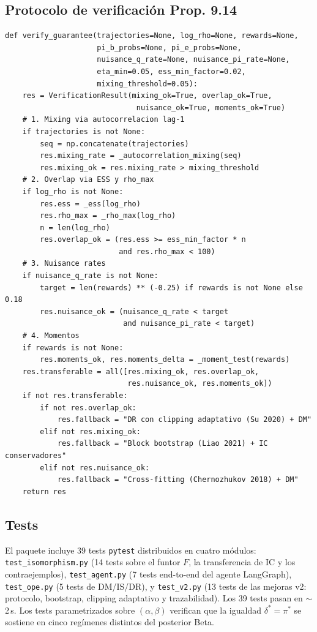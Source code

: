 \documentclass[11pt,a4paper]{article}
\theoremstyle{mitheorem}
\theoremstyle{mitdef}
\newcommand{\decrule}{\delta}
\newcommand{\policy}{\pi}
\begin{document}
\subsection{Protocolo de verificación Prop. 9.14}

\begin{lstlisting}[caption={Implementación del protocolo Prop.~9.14.}]
def verify_guarantee(trajectories=None, log_rho=None, rewards=None,
                     pi_b_probs=None, pi_e_probs=None,
                     nuisance_q_rate=None, nuisance_pi_rate=None,
                     eta_min=0.05, ess_min_factor=0.02,
                     mixing_threshold=0.05):
    res = VerificationResult(mixing_ok=True, overlap_ok=True,
                              nuisance_ok=True, moments_ok=True)
    # 1. Mixing via autocorrelacion lag-1
    if trajectories is not None:
        seq = np.concatenate(trajectories)
        res.mixing_rate = _autocorrelation_mixing(seq)
        res.mixing_ok = res.mixing_rate > mixing_threshold
    # 2. Overlap via ESS y rho_max
    if log_rho is not None:
        res.ess = _ess(log_rho)
        res.rho_max = _rho_max(log_rho)
        n = len(log_rho)
        res.overlap_ok = (res.ess >= ess_min_factor * n
                          and res.rho_max < 100)
    # 3. Nuisance rates
    if nuisance_q_rate is not None:
        target = len(rewards) ** (-0.25) if rewards is not None else 0.18
        res.nuisance_ok = (nuisance_q_rate < target
                           and nuisance_pi_rate < target)
    # 4. Momentos
    if rewards is not None:
        res.moments_ok, res.moments_delta = _moment_test(rewards)
    res.transferable = all([res.mixing_ok, res.overlap_ok,
                            res.nuisance_ok, res.moments_ok])
    if not res.transferable:
        if not res.overlap_ok:
            res.fallback = "DR con clipping adaptativo (Su 2020) + DM"
        elif not res.mixing_ok:
            res.fallback = "Block bootstrap (Liao 2021) + IC conservadores"
        elif not res.nuisance_ok:
            res.fallback = "Cross-fitting (Chernozhukov 2018) + DM"
    return res
\end{lstlisting}

\subsection{Tests}

El paquete incluye 39 tests \texttt{pytest} distribuidos en cuatro
módulos: \texttt{test\_isomorphism.py} (14 tests sobre el funtor $F$,
la transferencia de IC y los contraejemplos),
\texttt{test\_agent.py} (7 tests end-to-end del agente LangGraph),
\texttt{test\_ope.py} (5 tests de DM/IS/DR), y \texttt{test\_v2.py}
(13 tests de las mejoras v2: protocolo, bootstrap, clipping
adaptativo y trazabilidad). Los 39 tests pasan en
$\sim$2\,s. Los tests parametrizados sobre $(\alpha,\beta)$
verifican que la igualdad $\decrule^*=\policy^*$ se sostiene en
cinco regímenes distintos del posterior Beta.
\end{document}
